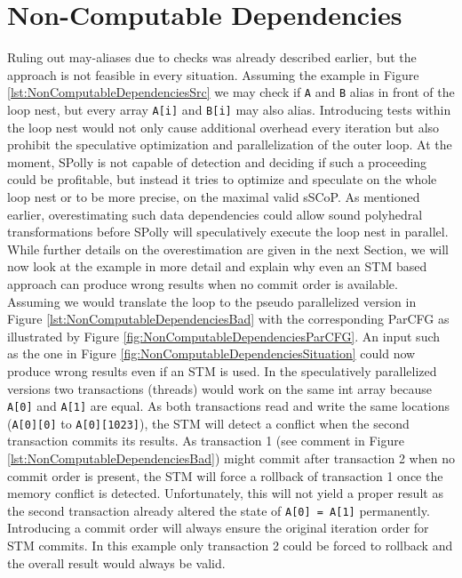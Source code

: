 \section{Non-Computable Dependencies}
\label{NonComputableDependencies}
Ruling out may-aliases due to checks was already described earlier, 
but the approach is not feasible in every situation. 
Assuming the example in Figure \ref{lst:NonComputableDependenciesSrc}
we may check if \texttt{A} and \texttt{B} alias in front of the loop nest, but
every array \texttt{A[i]} and \texttt{B[i]} may also alias. 
Introducing tests within the loop nest would not only cause additional overhead 
every iteration but also prohibit the speculative optimization and parallelization
of the outer loop. 
At the moment, SPolly is not capable of detection and deciding if 
such a proceeding could be profitable, but instead it tries to optimize and 
speculate on the whole loop nest or to be more precise, on the maximal valid sSCoP.
As mentioned earlier, overestimating such data dependencies could allow
sound polyhedral transformations before SPolly will speculatively execute the
loop nest in parallel. While further details on the overestimation are given in 
the next Section, we will now look at the example in more detail and explain why 
even an STM based approach can produce wrong results when no commit order is available.
\label{NonComputableDependenciesExample}
Assuming we would translate the loop to the pseudo parallelized version in Figure 
\ref{lst:NonComputableDependenciesBad} with the corresponding ParCFG as illustrated 
by Figure \ref{fig:NonComputableDependenciesParCFG}. An input such as the one 
in Figure \ref{fig:NonComputableDependenciesSituation} could now produce wrong 
results even if an STM is used. In the speculatively parallelized versions two
transactions (threads) would work on the same int array because \texttt{A[0]} and 
\texttt{A[1]} are equal. As both transactions read and write the same locations
(\texttt{A[0][0]} to \texttt{A[0][1023]}), the STM will detect
a conflict when the second transaction commits its results. As transaction 1 
(see comment in Figure \ref{lst:NonComputableDependenciesBad}) might commit 
after transaction 2 when no commit order is present, the STM will force a rollback
of transaction 1 once the memory conflict is detected. Unfortunately, this will 
not yield a proper result as the second transaction already altered the state 
of \texttt{A[0] = A[1]} permanently. Introducing a commit order will always 
ensure the original iteration order for STM commits. In this example only 
transaction 2 could be forced to rollback and the overall result would always be 
valid.


